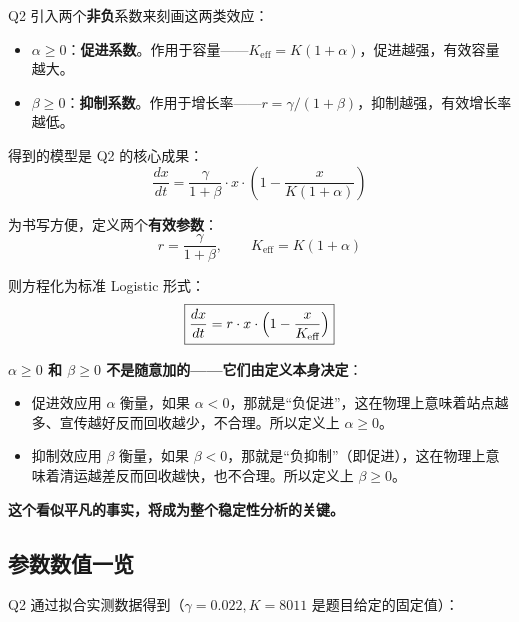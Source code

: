 \documentclass[12pt,a4paper]{article}
\begin{document}
Q2 引入两个\textbf{非负}系数来刻画这两类效应：
\begin{itemize}
  \item $\alpha \geq 0$：\textbf{促进系数}。作用于容量——$K_{\text{eff}} = K(1+\alpha)$，促进越强，有效容量越大。
  \item $\beta \geq 0$：\textbf{抑制系数}。作用于增长率——$r = \gamma/(1+\beta)$，抑制越强，有效增长率越低。
\end{itemize}

得到的模型是 Q2 的核心成果：
\begin{equation}\label{eq:model}
\boxed{\frac{dx}{dt} = \frac{\gamma}{1+\beta} \cdot x \cdot \left(1 - \frac{x}{K(1+\alpha)}\right)}
\end{equation}

为书写方便，定义两个\textbf{有效参数}：
\begin{equation}\label{eq:effective}
r = \frac{\gamma}{1+\beta}, \qquad K_{\text{eff}} = K(1+\alpha)
\end{equation}

则方程化为标准 Logistic 形式：
\begin{equation}\label{eq:standard}
\boxed{\frac{dx}{dt} = r \cdot x \cdot \Bigl(1 - \frac{x}{K_{\text{eff}}}\Bigr)}
\end{equation}

\begin{keypoint}[关键约束]
\textbf{$\alpha \geq 0$ 和 $\beta \geq 0$ 不是随意加的——它们由定义本身决定}：
\begin{itemize}
  \item 促进效应用 $\alpha$ 衡量，如果 $\alpha < 0$，那就是``负促进''，这在物理上意味着站点越多、宣传越好反而回收越少，不合理。所以定义上 $\alpha \geq 0$。
  \item 抑制效应用 $\beta$ 衡量，如果 $\beta < 0$，那就是``负抑制''（即促进），这在物理上意味着清运越差反而回收越快，也不合理。所以定义上 $\beta \geq 0$。
\end{itemize}
\textbf{这个看似平凡的事实，将成为整个稳定性分析的关键。}
\end{keypoint}

\subsection*{参数数值一览}

Q2 通过拟合实测数据得到（$\gamma = 0.022, K = 8011$ 是题目给定的固定值）：
\end{document}
